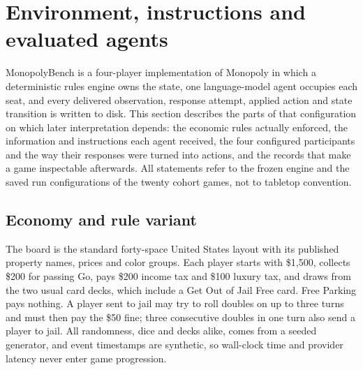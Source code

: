 
\section{Environment, instructions and evaluated agents}
\label{sec:environment}

MonopolyBench is a four-player implementation of Monopoly in which a deterministic rules engine owns the state, one language-model agent occupies each seat, and every delivered observation, response attempt, applied action and state transition is written to disk. This section describes the parts of that configuration on which later interpretation depends: the economic rules actually enforced, the information and instructions each agent received, the four configured participants and the way their responses were turned into actions, and the records that make a game inspectable afterwards. All statements refer to the frozen engine and the saved run configurations of the twenty cohort games, not to tabletop convention.

\subsection{Economy and rule variant}
\label{sec:rules}

The board is the standard forty-space United States layout with its published property names, prices and color groups. Each player starts with \$1,500, collects \$200 for passing Go, pays \$200 income tax and \$100 luxury tax, and draws from the two usual card decks, which include a Get Out of Jail Free card. Free Parking pays nothing. A player sent to jail may try to roll doubles on up to three turns and must then pay the \$50 fine; three consecutive doubles in one turn also send a player to jail. All randomness, dice and decks alike, comes from a seeded generator, and event timestamps are synthetic, so wall-clock time and provider latency never enter game progression.

